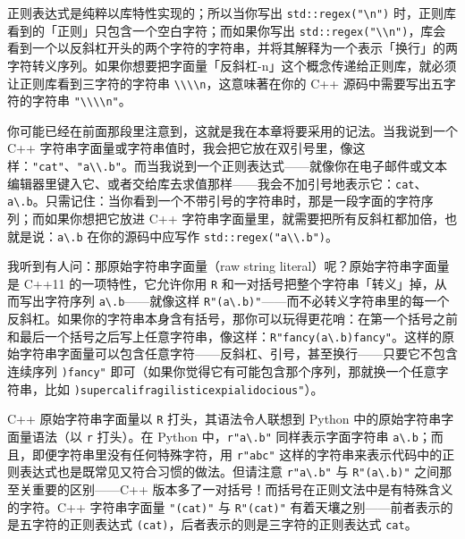 正则表达式是纯粹以库特性实现的；所以当你写出 \texttt{std::\allowbreak{}regex(\allowbreak{}"\textbackslash n")\allowbreak{}} 时，正则库看到的「正则」只包含一个空白字符；而如果你写出 \texttt{std::\allowbreak{}regex(\allowbreak{}"\textbackslash\textbackslash n")\allowbreak{}}，库会看到一个以反斜杠开头的两个字符的字符串，并将其解释为一个表示「换行」的两字符转义序列。如果你想要把字面量「反斜杠-n」这个概念传递给正则库，就必须让正则库看到三字符的字符串 \texttt{\textbackslash\textbackslash\textbackslash\textbackslash n}，这意味著在你的 C++ 源码中需要写出五字符的字符串 \texttt{"\textbackslash\textbackslash\textbackslash\textbackslash n"}。

你可能已经在前面那段里注意到，这就是我在本章将要采用的记法。当我说到一个 C++ 字符串字面量或字符串值时，我会把它放在双引号里，像这样：\texttt{"cat"}、\texttt{"a\textbackslash\textbackslash.\allowbreak{}b"}。而当我说到一个正则表达式——就像你在电子邮件或文本编辑器里键入它、或者交给库去求值那样——我会不加引号地表示它：\texttt{cat}、\texttt{a\textbackslash.\allowbreak{}b}。只需记住：当你看到一个不带引号的字符串时，那是一段字面的字符序列；而如果你想把它放进 C++ 字符串字面量里，就需要把所有反斜杠都加倍，也就是说：\texttt{a\textbackslash.\allowbreak{}b} 在你的源码中应写作 \texttt{std::\allowbreak{}regex(\allowbreak{}"a\textbackslash\textbackslash.\allowbreak{}b")\allowbreak{}}。

我听到有人问：那原始字符串字面量（raw string literal）呢？原始字符串字面量是 C++11 的一项特性，它允许你用 \texttt{R} 和一对括号把整个字符串「转义」掉，从而写出字符序列 \texttt{a\textbackslash.\allowbreak{}b}——就像这样 \texttt{R"(\allowbreak{}a\textbackslash.\allowbreak{}b)\allowbreak{}"}——而不必转义字符串里的每一个反斜杠。如果你的字符串本身含有括号，那你可以玩得更花哨：在第一个括号之前和最后一个括号之后写上任意字符串，像这样：\texttt{R"fancy(\allowbreak{}a\textbackslash.\allowbreak{}b)\allowbreak{}fancy"}。这样的原始字符串字面量可以包含任意字符——反斜杠、引号，甚至换行——只要它不包含连续序列 \texttt{)\allowbreak{}fancy"} 即可（如果你觉得它有可能包含那个序列，那就换一个任意字符串，比如 \texttt{)\allowbreak{}supercalifragilisticexpialidocious"}）。

C++ 原始字符串字面量以 \texttt{R} 打头，其语法令人联想到 Python 中的原始字符串字面量语法（以 \texttt{r} 打头）。在 Python 中，\texttt{r"a\textbackslash.\allowbreak{}b"} 同样表示字面字符串 \texttt{a\textbackslash.\allowbreak{}b}；而且，即便字符串里没有任何特殊字符，用 \texttt{r"abc"} 这样的字符串来表示代码中的正则表达式也是既常见又符合习惯的做法。但请注意 \texttt{r"a\textbackslash.\allowbreak{}b"} 与 \texttt{R"(\allowbreak{}a\textbackslash.\allowbreak{}b)\allowbreak{}"} 之间那至关重要的区别——C++ 版本多了一对括号！而括号在正则文法中是有特殊含义的字符。C++ 字符串字面量 \texttt{"(\allowbreak{}cat)\allowbreak{}"} 与 \texttt{R"(\allowbreak{}cat)\allowbreak{}"} 有着天壤之别——前者表示的是五字符的正则表达式 \texttt{(\allowbreak{}cat)\allowbreak{}}，后者表示的则是三字符的正则表达式 \texttt{cat}。


